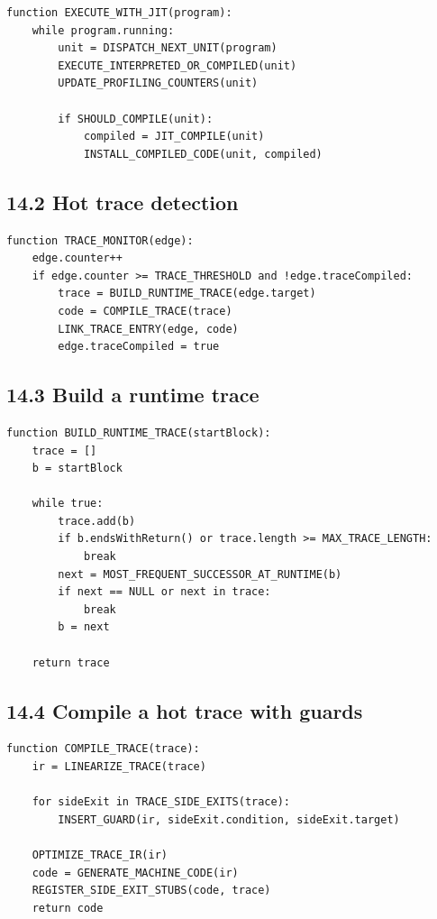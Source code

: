 \documentclass[10pt,letterpaper]{article}
\begin{document}
\begin{verbatim}
function EXECUTE_WITH_JIT(program):
    while program.running:
        unit = DISPATCH_NEXT_UNIT(program)
        EXECUTE_INTERPRETED_OR_COMPILED(unit)
        UPDATE_PROFILING_COUNTERS(unit)

        if SHOULD_COMPILE(unit):
            compiled = JIT_COMPILE(unit)
            INSTALL_COMPILED_CODE(unit, compiled)
\end{verbatim}

\subsection*{14.2 Hot trace detection}

\begin{verbatim}
function TRACE_MONITOR(edge):
    edge.counter++
    if edge.counter >= TRACE_THRESHOLD and !edge.traceCompiled:
        trace = BUILD_RUNTIME_TRACE(edge.target)
        code = COMPILE_TRACE(trace)
        LINK_TRACE_ENTRY(edge, code)
        edge.traceCompiled = true
\end{verbatim}

\subsection*{14.3 Build a runtime trace}

\begin{verbatim}
function BUILD_RUNTIME_TRACE(startBlock):
    trace = []
    b = startBlock

    while true:
        trace.add(b)
        if b.endsWithReturn() or trace.length >= MAX_TRACE_LENGTH:
            break
        next = MOST_FREQUENT_SUCCESSOR_AT_RUNTIME(b)
        if next == NULL or next in trace:
            break
        b = next

    return trace
\end{verbatim}

\subsection*{14.4 Compile a hot trace with guards}

\begin{verbatim}
function COMPILE_TRACE(trace):
    ir = LINEARIZE_TRACE(trace)

    for sideExit in TRACE_SIDE_EXITS(trace):
        INSERT_GUARD(ir, sideExit.condition, sideExit.target)

    OPTIMIZE_TRACE_IR(ir)
    code = GENERATE_MACHINE_CODE(ir)
    REGISTER_SIDE_EXIT_STUBS(code, trace)
    return code
\end{verbatim}
\end{document}

